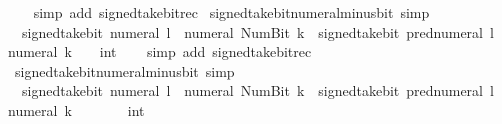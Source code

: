 \begin{isabellebody}
%
\isadelimproof
\ \ %
\endisadelimproof
%
\isatagproof
{}\isamarkupfalse%
\ {\isacharparenleft}{\kern0pt}simp\ add{\isacharcolon}{\kern0pt}\ signed{\isacharunderscore}{\kern0pt}take{\isacharunderscore}{\kern0pt}bit{\isacharunderscore}{\kern0pt}rec{\isacharparenright}{\kern0pt}%
\endisatagproof
{\isafoldproof}%
%
\isadelimproof
\isanewline
%
\endisadelimproof
\isanewline
{}\isamarkupfalse%
\ signed{\isacharunderscore}{\kern0pt}take{\isacharunderscore}{\kern0pt}bit{\isacharunderscore}{\kern0pt}numeral{\isacharunderscore}{\kern0pt}minus{\isacharunderscore}{\kern0pt}bit{}\ {\isacharbrackleft}{\kern0pt}simp{\isacharbrackright}{\kern0pt}{\isacharcolon}{\kern0pt}\isanewline
\ \ {\isacartoucheopen}signed{\isacharunderscore}{\kern0pt}take{\isacharunderscore}{\kern0pt}bit\ {\isacharparenleft}{\kern0pt}numeral\ l{\isacharparenright}{\kern0pt}\ {\isacharparenleft}{\kern0pt}{\isacharminus}{\kern0pt}\ numeral\ {\isacharparenleft}{\kern0pt}Num{\isachardot}{\kern0pt}Bit{}\ k{\isacharparenright}{\kern0pt}{\isacharparenright}{\kern0pt}\ {\isacharequal}{\kern0pt}\ signed{\isacharunderscore}{\kern0pt}take{\isacharunderscore}{\kern0pt}bit\ {\isacharparenleft}{\kern0pt}pred{\isacharunderscore}{\kern0pt}numeral\ l{\isacharparenright}{\kern0pt}\ {\isacharparenleft}{\kern0pt}{\isacharminus}{\kern0pt}\ numeral\ k{\isacharparenright}{\kern0pt}\ {\isacharasterisk}{\kern0pt}\ {\isacharparenleft}{\kern0pt}{}\ {\isacharcolon}{\kern0pt}{\isacharcolon}{\kern0pt}\ int{\isacharparenright}{\kern0pt}{\isacartoucheclose}\isanewline
%
\isadelimproof
\ \ %
\endisadelimproof
%
\isatagproof
{}\isamarkupfalse%
\ {\isacharparenleft}{\kern0pt}simp\ add{\isacharcolon}{\kern0pt}\ signed{\isacharunderscore}{\kern0pt}take{\isacharunderscore}{\kern0pt}bit{\isacharunderscore}{\kern0pt}rec{\isacharparenright}{\kern0pt}%
\endisatagproof
{\isafoldproof}%
%
\isadelimproof
\isanewline
%
\endisadelimproof
\isanewline
{}\isamarkupfalse%
\ signed{\isacharunderscore}{\kern0pt}take{\isacharunderscore}{\kern0pt}bit{\isacharunderscore}{\kern0pt}numeral{\isacharunderscore}{\kern0pt}minus{\isacharunderscore}{\kern0pt}bit{}\ {\isacharbrackleft}{\kern0pt}simp{\isacharbrackright}{\kern0pt}{\isacharcolon}{\kern0pt}\isanewline
\ \ {\isacartoucheopen}signed{\isacharunderscore}{\kern0pt}take{\isacharunderscore}{\kern0pt}bit\ {\isacharparenleft}{\kern0pt}numeral\ l{\isacharparenright}{\kern0pt}\ {\isacharparenleft}{\kern0pt}{\isacharminus}{\kern0pt}\ numeral\ {\isacharparenleft}{\kern0pt}Num{\isachardot}{\kern0pt}Bit{}\ k{\isacharparenright}{\kern0pt}{\isacharparenright}{\kern0pt}\ {\isacharequal}{\kern0pt}\ signed{\isacharunderscore}{\kern0pt}take{\isacharunderscore}{\kern0pt}bit\ {\isacharparenleft}{\kern0pt}pred{\isacharunderscore}{\kern0pt}numeral\ l{\isacharparenright}{\kern0pt}\ {\isacharparenleft}{\kern0pt}{\isacharminus}{\kern0pt}\ numeral\ k\ {\isacharminus}{\kern0pt}\ {}{\isacharparenright}{\kern0pt}\ {\isacharasterisk}{\kern0pt}\ {}\ {\isacharplus}{\kern0pt}\ {\isacharparenleft}{\kern0pt}{}\ {\isacharcolon}{\kern0pt}{\isacharcolon}{\kern0pt}\ int{\isacharparenright}{\kern0pt}{\isacartoucheclose}\isanewline

\end{isabellebody}
